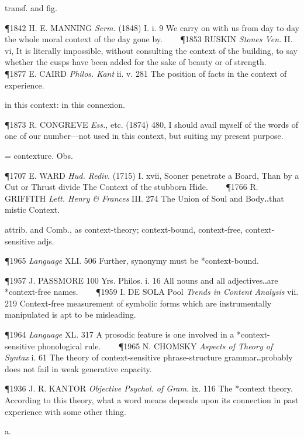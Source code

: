 \begin{description}[wide, labelwidth=!, labelindent=0pt]
\begin{myenumerate}
 transf. and fig.

\P 1842 H. E. MANNING  \textit{Serm.} (1848) I. i. 9 We carry on with us from day to day the whole moral context of the day gone by.    
\P 1853 RUSKIN  \textit{Stones Ven.} II. vi, It is literally impossible, without consulting the context of the building, to say whether the cusps have been added for the sake of beauty or of strength.    
\P 1877 E. CAIRD  \textit{Philos. Kant} ii. v. 281 The position of facts in the context of experience.

 in this context: in this connexion.

\P 1873 R. CONGREVE  \textit{Ess.}, etc. (1874) 480, I should avail myself of the words of one of our number—not used in this context, but suiting my present purpose.

 = contexture. Obs.

\P 1707 E. WARD  \textit{Hud. Rediv.} (1715) I. xvii, Sooner penetrate a Board, Than by a Cut or Thrust divide The Context of the stubborn Hide.    
\P 1766 R. GRIFFITH  \textit{Lett. Henry \& Frances} III. 274 The Union of Soul and Body‥that mistic Context.

 attrib. and Comb., as context-theory; context-bound, context-free, context-sensitive adjs.

\P 1965 \textit{Language}  XLI. 506 Further, synonymy must be *context-bound.

\P 1957 J. PASSMORE  100 Yrs. Philos. i. 16 All nouns and all adjectives‥are *context-free names.    
\P 1959 I. DE SOLA  Pool \textit{Trends in Content Analysis} vii. 219 Context-free measurement of symbolic forms which are instrumentally manipulated is apt to be misleading.

\P 1964 \textit{Language}  XL. 317 A prosodic feature is one involved in a *context-sensitive phonological rule.    
\P 1965 N. CHOMSKY  \textit{Aspects of Theory of Syntax} i. 61 The theory of context-sensitive phrase-structure grammar‥probably does not fail in weak generative capacity.

\P 1936 J. R. KANTOR  \textit{Objective Psychol. of Gram.} ix. 116 The *context theory. According to this theory, what a word means depends upon its connection in past experience with some other thing.
\end{myenumerate}


 a.

\noindent {}


\end{description}
